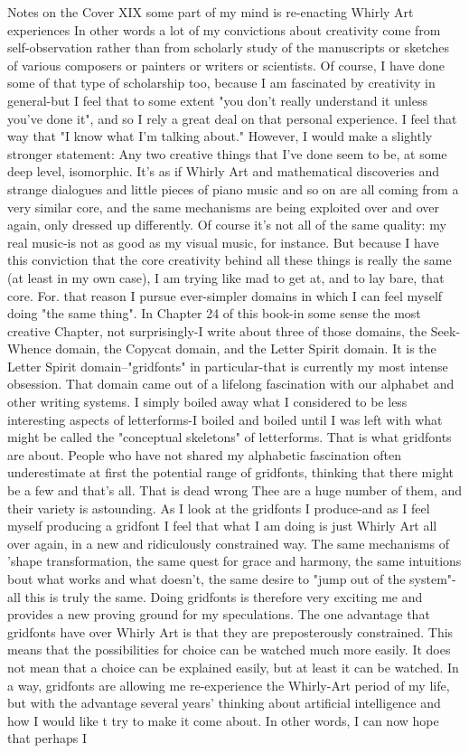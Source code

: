 Notes on the Cover                                                                   XIX some part of my mind is re-enacting Whirly Art experiences In other words a lot of my convictions about creativity come from self-observation rather than from scholarly study of the manuscripts or sketches of various composers or painters or writers or scientists. Of course, I have done some of that type of scholarship too, because I am fascinated by creativity in general-but I feel that to some extent "you don't really understand it unless you've done it", and so I rely a great deal on that personal experience. I feel that way that "I know what I'm talking about." However, I would make a slightly stronger statement: Any two creative things that I've done seem to be, at some deep level, isomorphic. It's as if Whirly Art and mathematical discoveries and strange dialogues and little pieces of piano music and so on are all coming from a very similar core, and the same mechanisms are being exploited over and over again, only dressed up differently. Of course it's not all of the same quality: my real music-is not as good as my visual music, for instance. But because I have this conviction that the core creativity behind all these things is really the same (at least in my own case), I am trying like mad to get at, and to lay bare, that core. For. that reason I pursue ever-simpler domains in which I can feel myself doing "the same thing". In Chapter 24 of this book-in some sense the most creative Chapter, not surprisingly-I write about three of those domains, the Seek-Whence domain, the Copycat domain, and the Letter Spirit domain. It is the Letter Spirit domain--"gridfonts" in particular-that is currently my most intense obsession. That domain came out of a lifelong fascination with our alphabet and other writing systems. I simply boiled away what I considered to be less interesting aspects of letterforms-I boiled and boiled until I was left with what might be called the "conceptual skeletons" of letterforms. That is what gridfonts are about. People who have not shared my alphabetic fascination often underestimate at first the potential range of gridfonts, thinking that there might be a few and that's all. That is dead wrong Thee are a huge number of them, and their variety is astounding. As I look at the gridfonts I produce-and as I feel myself producing a gridfont I feel that what I am doing is just Whirly Art all over again, in a new and ridiculously constrained way. The same mechanisms of 'shape transformation, the same quest for grace and harmony, the same intuitions bout what works and what doesn't, the same desire to "jump out of the system"-all this is truly the same. Doing gridfonts is therefore very exciting me and provides a new proving ground for my speculations. The one advantage that gridfonts have over Whirly Art is that they are preposterously constrained. This means that the possibilities for choice can be watched much more easily. It does not mean that a choice can be explained easily, but at least it can be watched. In a way, gridfonts are allowing me re-experience the Whirly-Art period of my life, but with the advantage several years' thinking about artificial intelligence and how I would like t try to make it come about. In other words, I can now hope that perhaps I 
